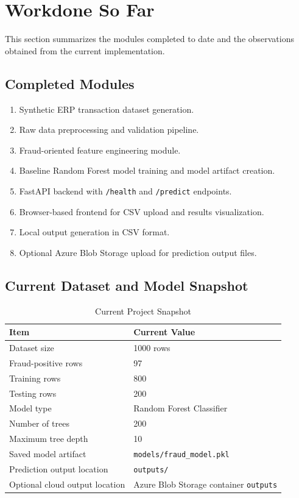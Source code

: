 \documentclass[a4paper,12pt]{article}
\begin{document}
\section{Workdone So Far}
This section summarizes the modules completed to date and the observations obtained from the current implementation.

\subsection{Completed Modules}
\begin{enumerate}[noitemsep]
    \item Synthetic ERP transaction dataset generation.
    \item Raw data preprocessing and validation pipeline.
    \item Fraud-oriented feature engineering module.
    \item Baseline Random Forest model training and model artifact creation.
    \item FastAPI backend with \texttt{/health} and \texttt{/predict} endpoints.
    \item Browser-based frontend for CSV upload and results visualization.
    \item Local output generation in CSV format.
    \item Optional Azure Blob Storage upload for prediction output files.
\end{enumerate}

\subsection{Current Dataset and Model Snapshot}
\begin{table}[H]
\centering
\caption{Current Project Snapshot}
\begin{tabular}{p{5.5cm} p{5cm}}
\toprule
\textbf{Item} & \textbf{Current Value} \\
\midrule
Dataset size & 1000 rows \\
Fraud-positive rows & 97 \\
Training rows & 800 \\
Testing rows & 200 \\
Model type & Random Forest Classifier \\
Number of trees & 200 \\
Maximum tree depth & 10 \\
Saved model artifact & \texttt{models/fraud\_model.pkl} \\
Prediction output location & \texttt{outputs/} \\
Optional cloud output location & Azure Blob Storage container \texttt{outputs} \\
\bottomrule
\end{tabular}
\end{table}
\end{document}
